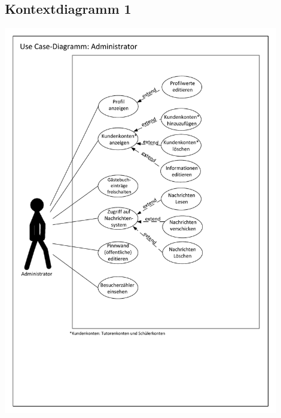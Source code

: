 \documentclass[10pt,a4paper]{scrartcl}
\begin{document}
\subsection{Kontextdiagramm 1}
\includegraphics[width=0.9\textwidth]{./Source/UseCaseAdministrator_11.pdf}
\end{document}
